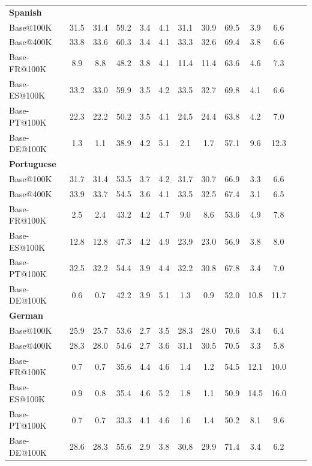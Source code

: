 \begin{table}[h]
\begin{center}
\begin{sc}
{\begin{tabular}{lcccccccccccc}
    \midrule
    \textbf{Spanish} \\
    Base@100K
        & 31.5 & 31.4 & 59.2 & 3.4 & 4.1
        & 31.1 & 30.9 & 69.5 & 3.9 & 6.6 \\
    Base@400K
        & 33.8 & 33.6 & 60.3 & 3.4 & 4.1
        & 33.3 & 32.6 & 69.4 & 3.8 & 6.6 \\
    Base-FR@100K
        & 8.9 & 8.8 & 48.2 & 3.8 & 4.1
        & 11.4 & 11.4 & 63.6 & 4.6 & 7.3 \\
    Base-ES@100K
        & 33.2 & 33.0 & 59.9 & 3.5 & 4.2
        & 33.5 & 32.7 & 69.8 & 4.1 & 6.6 \\
    Base-PT@100K
        & 22.3 & 22.2 & 50.2 & 3.5 & 4.1
        & 24.5 & 24.4 & 63.8 & 4.2 & 7.0 \\
    Base-DE@100K
        & 1.3 & 1.1 & 38.9 & 4.2 & 5.1
        & 2.1 & 1.7 & 57.1 & 9.6 & 12.3 \\
    
    \midrule
    \textbf{Portuguese} \\
    Base@100K
        & 31.7 & 31.4 & 53.5 & 3.7 & 4.2
        & 31.7 & 30.7 & 66.9 & 3.3 & 6.6 \\
    Base@400K
        & 33.9 & 33.7 & 54.5 & 3.6 & 4.1
        & 33.5 & 32.5 & 67.4 & 3.1 & 6.5 \\
    Base-FR@100K
        & 2.5 & 2.4 & 43.2 & 4.2 & 4.7
        & 9.0 & 8.6 & 53.6 & 4.9 & 7.8 \\
    Base-ES@100K
        & 12.8 & 12.8 & 47.3 & 4.2 & 4.9
        & 23.9 & 23.0 & 56.9 & 3.8 & 8.0 \\
    Base-PT@100K
        & 32.5 & 32.2 & 54.4 & 3.9 & 4.4
        & 32.2 & 30.8 & 67.8 & 3.4 & 7.0 \\
    Base-DE@100K
        & 0.6 & 0.7 & 42.2 & 3.9 & 5.1
        & 1.3 & 0.9 & 52.0 & 10.8 & 11.7 \\
    
    \midrule
    \textbf{German} \\
    Base@100K
        & 25.9 & 25.7 & 53.6 & 2.7 & 3.5
        & 28.3 & 28.0 & 70.6 & 3.4 & 6.4 \\
    Base@400K
        & 28.3 & 28.0 & 54.6 & 2.7 & 3.6
        & 31.1 & 30.5 & 70.5 & 3.3 & 5.8 \\
    Base-FR@100K
        & 0.7 & 0.7 & 35.6 & 4.4 & 4.6
        & 1.4 & 1.2 & 54.5 & 12.1 & 10.0 \\
    Base-ES@100K
        & 0.9 & 0.8 & 35.4 & 4.6 & 5.2
        & 1.8 & 1.1 & 50.9 & 14.5 & 16.0 \\
    Base-PT@100K
        & 0.7 & 0.7 & 33.3 & 4.1 & 4.6
        & 1.6 & 1.4 & 50.2 & 8.1 & 9.6 \\
    Base-DE@100K
        & 28.6 & 28.3 & 55.6 & 2.9 & 3.8
        & 30.8 & 29.9 & 71.4 & 3.4 & 6.2 \\
        
    \bottomrule
    \end{tabular}}
    \end{sc}
    \end{center}
\end{table}

